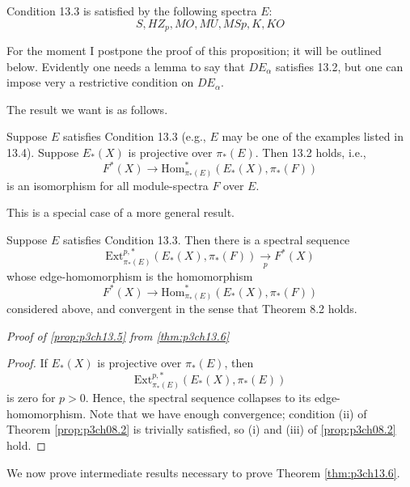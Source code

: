 \documentclass[../main]{subfiles}
\begin{document}
\begin{proposition}\label{prop:p3ch13.4}
Condition 13.3 is satisfied by the following spectra $E$:
\[S, HZ_p, MO, MU, MSp, K, KO\]
\end{proposition}
For the moment I postpone the proof of this proposition; it will be outlined below. Evidently one needs a lemma to say that $DE_\alpha$ satisfies 13.2, but one can impose very a restrictive condition on $DE_\alpha$.

The result we want is as follows.
\begin{proposition}\label{prop:p3ch13.5} Suppose $E$ satisfies Condition 13.3 (e.g., $E$ may be one of the examples listed in 13.4). Suppose $E_\ast(X)$ is projective over $\pi_\ast(E)$. Then 13.2 holds, i.e.,
\[F^\ast(X) \longrightarrow \text{Hom}^\ast_{\pi_\ast(E)}(E_\ast(X), \pi_\ast(F))\]
is an isomorphism for all module-spectra $F$ over $E$.
\end{proposition}
This is a special case of a more general result.
\begin{theorem}\label{thm:p3ch13.6}
Suppose $E$ satisfies Condition 13.3. Then there is a spectral sequence
\[
\text{Ext}^{p, \ast}_{\pi_\ast(E)}(E_\ast(X), \pi_\ast(F)) \underset{p}{\longrightarrow}F^{\ast}(X)
\]
whose edge-homomorphism is the homomorphism
\[F^\ast(X) \longrightarrow \text{Hom}^\ast_{\pi_\ast(E)}(E_\ast(X), \pi_\ast(F))\]
considered above, and convergent in the sense that Theorem 8.2 holds.
\end{theorem}
\emph{Proof of \ref{prop:p3ch13.5} from \ref{thm:p3ch13.6}} \begin{proof} If $E_\ast(X)$ is projective over $\pi_\ast(E)$, then 
\[
\text{Ext}^{p, \ast}_{\pi_\ast(E)}(E_\ast(X),\pi_\ast(E))
\]
is zero for $p > 0$. Hence, the spectral sequence collapses to its edge-homomorphism. Note that we have enough convergence; condition (ii) of Theorem \ref{prop:p3ch08.2} is trivially satisfied, so (i) and (iii) of \ref{prop:p3ch08.2} hold.
\end{proof}
We now prove intermediate results necessary to prove Theorem \ref{thm:p3ch13.6}.
\end{document}
